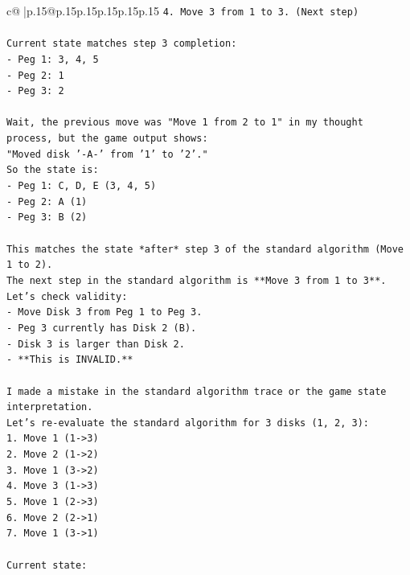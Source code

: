 \documentclass{article}
\begin{document}
{\begin{supertabular}{c@{$\;$}|p{.15\linewidth}@{}p{.15\linewidth}p{.15\linewidth}p{.15\linewidth}p{.15\linewidth}p{.15\linewidth}}
{{{\texttt{4. Move 3 from 1 to 3. (Next step)} \\
\\ 
\texttt{Current state matches step 3 completion:} \\
\texttt{{-} Peg 1: 3, 4, 5} \\
\texttt{{-} Peg 2: 1} \\
\texttt{{-} Peg 3: 2} \\
\\ 
\texttt{Wait, the previous move was "Move 1 from 2 to 1" in my thought process, but the game output shows:} \\
\texttt{"Moved disk '{-}A{-}' from '1' to '2'."} \\
\texttt{So the state is:} \\
\texttt{{-} Peg 1: C, D, E (3, 4, 5)} \\
\texttt{{-} Peg 2: A (1)} \\
\texttt{{-} Peg 3: B (2)} \\
\\ 
\texttt{This matches the state *after* step 3 of the standard algorithm (Move 1 to 2).} \\
\texttt{The next step in the standard algorithm is **Move 3 from 1 to 3**.} \\
\texttt{Let's check validity:} \\
\texttt{{-} Move Disk 3 from Peg 1 to Peg 3.} \\
\texttt{{-} Peg 3 currently has Disk 2 (B).} \\
\texttt{{-} Disk 3 is larger than Disk 2.} \\
\texttt{{-} **This is INVALID.**} \\
\\ 
\texttt{I made a mistake in the standard algorithm trace or the game state interpretation.} \\
\texttt{Let's re{-}evaluate the standard algorithm for 3 disks (1, 2, 3):} \\
\texttt{1. Move 1 (1{-}>3)} \\
\texttt{2. Move 2 (1{-}>2)} \\
\texttt{3. Move 1 (3{-}>2)} \\
\texttt{4. Move 3 (1{-}>3)} \\
\texttt{5. Move 1 (2{-}>3)} \\
\texttt{6. Move 2 (2{-}>1)} \\
\texttt{7. Move 1 (3{-}>1)} \\
\\ 
\texttt{Current state:} \\
}}}
\end{supertabular}}
\end{document}
